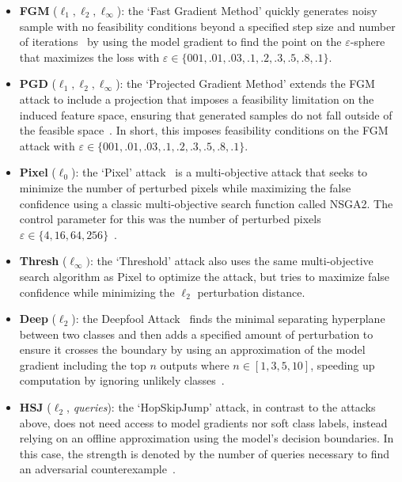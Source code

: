 \begin{itemize}
    \item \textbf{FGM} ($\ell_1, \ell_2, \ell_{\infty}$): the `Fast Gradient Method' quickly generates noisy sample with no feasibility conditions beyond a specified step size and number of iterations~\citep{fgm} by using the model gradient to find the point on the $\varepsilon$-sphere that maximizes the loss with $\varepsilon \in \{001,.01,.03,.1,.2,.3,.5,.8,.1\}$.
    \item \textbf{PGD}  ($\ell_1, \ell_2, \ell_{\infty}$):  the `Projected Gradient Method' extends the FGM attack to include a projection that imposes a feasibility limitation on the induced feature space, ensuring that generated samples do not fall outside of the feasible space~\citep{madry2017towards}. In short, this imposes feasibility conditions on the FGM attack with $\varepsilon \in \{001,.01,.03,.1,.2,.3,.5,.8,.1\}$.
    \item \textbf{Pixel} ($\ell_0$): the `Pixel' attack~\citep{pixelattack} is a multi-objective attack that seeks to minimize the number of perturbed pixels  while maximizing the false confidence using a classic multi-objective search function called NSGA2\citep{nsga2}. The control parameter for this was the number of perturbed pixels $\varepsilon \in \{4, 16, 64, 256\}$~.
    \item \textbf{Thresh} ($\ell_{\infty})$: the `Threshold' attack also uses the same multi-objective search algorithm as Pixel to optimize the attack, but tries to maximize false confidence while minimizing the $\ell_2$ perturbation distance.
    \item \textbf{Deep} ($\ell_2$): the Deepfool Attack~\citep{deepfool} finds the minimal separating hyperplane between two classes and then adds a specified amount of perturbation to ensure it crosses the boundary by using an approximation of the model gradient including the top $n$ outputs where $n \in [1,3,5,10]$, speeding up computation by ignoring unlikely classes~\citep{kotyan2022adversarial}.
    \item \textbf{HSJ} ($\ell_2$, \textit{queries}): the `HopSkipJump' attack, in contrast to the attacks above, does not need access to model gradients nor soft class labels, instead relying on an offline approximation using the model's decision boundaries. In this case, the strength is denoted by the number of queries necessary to find an adversarial counterexample~\citep{hopskipjump}.

\end{itemize}
